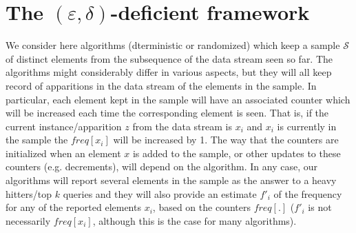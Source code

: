 \documentclass{article}
\begin{document}
\section{The $(\varepsilon,\delta)$-deficient framework}
We consider here algorithms (dterministic or randomized) which keep a
sample $\mathcal{S}$ of distinct elements from the subsequence of the
data stream seen so far. The algorithms might considerably differ in
various aspects, but they will all keep record of apparitions in the
data stream of the elements in the sample. In particular, each element
kept in the sample will have an associated counter which will be
increased each time the corresponding element is seen. That is, if the
current instance/apparition $z$ from the data stream is $x_i$ and
$x_i$ is currently in the sample the $freq[x_i]$ will be increased by 1.
The way that the counters are initialized when an element $x$ is added
to the sample, or other updates to these counters (e.g. decrements), will
depend on the algorithm. In any case, our algorithms will report
several elements in the sample as the answer to a heavy hitters/top $k$ queries
and they will also provide an estimate $f'_i$ of the frequency
for any of the reported elements $x_i$, based on the counters $freq[.]$
($f'_i$ is not necessarily $freq[x_i]$, although this is the case
for many algorithms).
\end{document}
